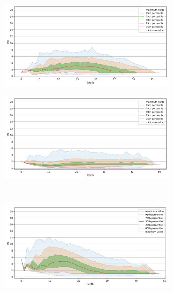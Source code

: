 \begin{figure}
    \begin{subfigure}[b]{0.47\textwidth}
        \includegraphics[width=0.95\textwidth]{images/lfd/fashion-mnist-60000.png}\\
        \label{fig:results:fashion-mnist-lfd}
    \end{subfigure}%
    \begin{subfigure}[b]{0.47\textwidth}
        \includegraphics[width=0.95\textwidth]{images/lfd/glove-25-1183514.png}\\
        \label{fig:results:glove-25-lfd}
    \end{subfigure}
    \vspace{1em}
    \\
    \begin{subfigure}[b]{0.47\textwidth}
        \includegraphics[width=0.95\textwidth]{images/lfd/sift-1000000.png}\\

\end{subfigure}
\end{figure}
